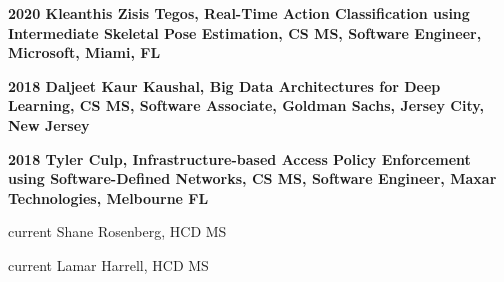 \documentclass[12pt,letterpaper]{report}
\newcommand{\listitemspace}{0.25em}
\renewenvironment{itemize}
{\begin{list}{}{\setlength{\leftmargin}{0em}
                \setlength{\parskip}{0em}
                \setlength{\itemsep}{\listitemspace}
                \setlength{\parsep}{\listitemspace}}}
{\end{list}}
\begin{document}
\begin{itemize}
        \item \textbf{2020 Kleanthis Zisis Tegos, Real-Time Action Classification using Intermediate Skeletal Pose Estimation, CS MS, Software Engineer, Microsoft, Miami, FL}
        \item \textbf{2018 Daljeet Kaur Kaushal, Big Data Architectures for Deep Learning, CS MS, Software Associate, Goldman Sachs, Jersey City, New Jersey} 
        \item \textbf{2018 Tyler Culp, Infrastructure-based Access Policy Enforcement using Software-Defined Networks, CS MS, Software Engineer, Maxar Technologies, Melbourne FL}
        \item current Shane Rosenberg, HCD MS
        \item current Lamar Harrell, HCD MS

    \end{itemize}
\end{document}
